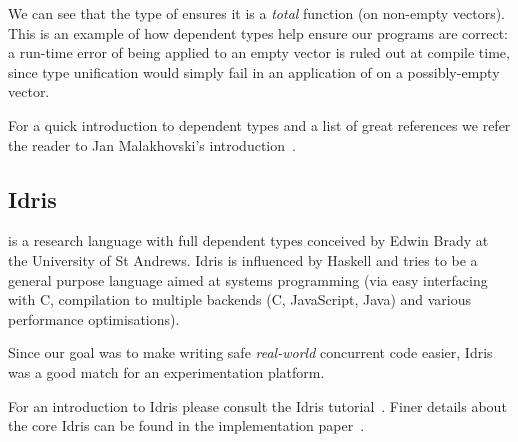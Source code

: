 We can see that the type of  ensures it is a \emph{total} function
(on non-empty vectors). This is an example of how dependent types help ensure
our programs are correct: a run-time error of  being applied to an
empty vector is ruled out at compile time, since type unification would simply
fail in an application of  on a possibly-empty vector.

For a quick introduction to dependent types and a list of great references we
refer the reader to Jan Malakhovski's introduction~\cite{deptypes-intro}.

\subsection{Idris}

\Idris{} is a research language with full dependent types conceived by Edwin
Brady at the University of St Andrews. Idris is influenced by Haskell and tries
to be a general purpose language aimed at systems programming (via easy
interfacing with C, compilation to multiple backends (C, JavaScript, Java) and
various performance optimisations).

Since our goal was to make writing safe \emph{real-world} concurrent code
easier, Idris was a good match for an experimentation platform.

For an introduction to Idris please consult the Idris
tutorial~\cite{idris-tutorial}. Finer details about the core Idris can be found
in the implementation paper~\cite{idris-impl}.
